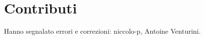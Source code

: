 \documentclass[italian,a4paper,hidelinks,headinclude]{scrartcl}
\begin{document}
%
\section{Contributi}

Hanno segnalato errori e correzioni:
niccolo-p,
Antoine Venturini.
\end{document}
